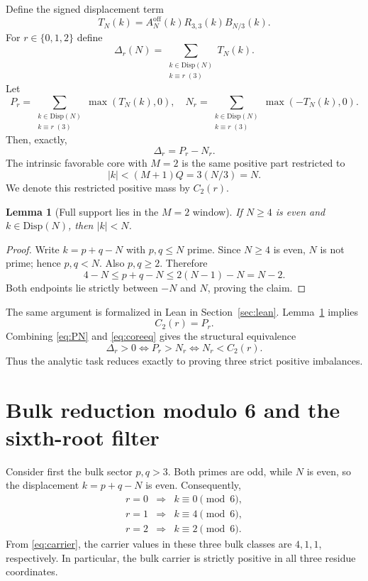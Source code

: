 \documentclass[11pt]{article}
\newtheorem{lemma}[theorem]{Lemma}
\theoremstyle{definition}
\newcommand{\Disp}{\mathrm{Disp}}
\newcommand{\abs}[1]{\left|#1\right|}
\begin{document}
Define the signed displacement term
\begin{equation}\label{eq:T}
T_N(k)=A_N^{\mathrm{off}}(k)R_{3,3}(k)B_{N/3}(k).
\end{equation}
For $r\in\{0,1,2\}$ define
\begin{equation}\label{eq:delta}
\Delta_r(N)
=
\sum_{\substack{k\in\Disp(N)\\k\equiv r\;(3)}}T_N(k).
\end{equation}
Let
\[
P_r=
\sum_{\substack{k\in\Disp(N)\\k\equiv r\;(3)}}\max(T_N(k),0),
\quad
N_r=
\sum_{\substack{k\in\Disp(N)\\k\equiv r\;(3)}}\max(-T_N(k),0).
\]
Then, exactly,
\begin{equation}\label{eq:PN}
\Delta_r=P_r-N_r.
\end{equation}
The intrinsic favorable core with $M=2$ is the same positive part restricted to
\[
\abs{k}<(M+1)Q=3(N/3)=N.
\]
We denote this restricted positive mass by $C_2(r)$.

\begin{lemma}[Full support lies in the $M=2$ window]\label{lem:window}
If $N\ge4$ is even and $k\in\Disp(N)$, then $\abs{k}<N$.
\end{lemma}
\begin{proof}
Write $k=p+q-N$ with $p,q\le N$ prime. Since $N\ge4$ is even, $N$ is not prime; hence $p,q<N$. Also $p,q\ge2$. Therefore
\[
4-N\le p+q-N\le2(N-1)-N=N-2.
\]
Both endpoints lie strictly between $-N$ and $N$, proving the claim.
\end{proof}

The same argument is formalized in Lean in Section~\ref{sec:lean}. Lemma~\ref{lem:window} implies
\begin{equation}\label{eq:coreeq}
\boxed{C_2(r)=P_r.}
\end{equation}
Combining \eqref{eq:PN} and \eqref{eq:coreeq} gives the structural equivalence
\begin{equation}\label{eq:structural-equiv}
\boxed{
\Delta_r>0
\iff P_r>N_r
\iff N_r<C_2(r).
}
\end{equation}
Thus the analytic task reduces exactly to proving three strict positive imbalances.

\section{Bulk reduction modulo 6 and the sixth-root filter}\label{sec:rootfilter}

Consider first the bulk sector $p,q>3$. Both primes are odd, while $N$ is even, so the displacement $k=p+q-N$ is even. Consequently,
\[
\begin{array}{ccl}
r=0&\Longrightarrow&k\equiv0\pmod6,\\
r=1&\Longrightarrow&k\equiv4\pmod6,\\
r=2&\Longrightarrow&k\equiv2\pmod6.
\end{array}
\]
From \eqref{eq:carrier}, the carrier values in these three bulk classes are $4,1,1$, respectively. In particular, the bulk carrier is strictly positive in all three residue coordinates.
\end{document}
